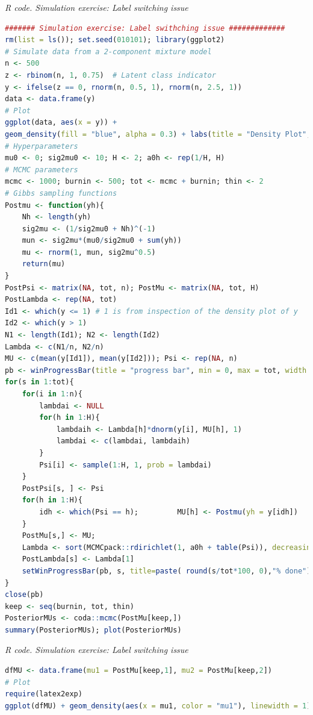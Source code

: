 \begin{tcolorbox}[enhanced,width=4.67in,center upper,
	fontupper=\large\bfseries,drop shadow southwest,sharp corners]
	\textit{R code. Simulation exercise: Label switching issue}
	\begin{VF}
		\begin{lstlisting}[language=R]
			####### Simulation exercise: Label swithching issue #############
rm(list = ls()); set.seed(010101); library(ggplot2)
# Simulate data from a 2-component mixture model
n <- 500
z <- rbinom(n, 1, 0.75)  # Latent class indicator
y <- ifelse(z == 0, rnorm(n, 0.5, 1), rnorm(n, 2.5, 1))
data <- data.frame(y)
# Plot
ggplot(data, aes(x = y)) +
geom_density(fill = "blue", alpha = 0.3) + labs(title = "Density Plot", x = "y", y = "Density") + theme_minimal()
# Hyperparameters
mu0 <- 0; sig2mu0 <- 10; H <- 2; a0h <- rep(1/H, H)
# MCMC parameters
mcmc <- 1000; burnin <- 500; tot <- mcmc + burnin; thin <- 2
# Gibbs sampling functions
Postmu <- function(yh){
	Nh <- length(yh)
	sig2mu <- (1/sig2mu0 + Nh)^(-1)
	mun <- sig2mu*(mu0/sig2mu0 + sum(yh))
	mu <- rnorm(1, mun, sig2mu^0.5)
	return(mu)
}
PostPsi <- matrix(NA, tot, n); PostMu <- matrix(NA, tot, H)
PostLambda <- rep(NA, tot)
Id1 <- which(y <= 1) # 1 is from inspection of the density plot of y 
Id2 <- which(y > 1)
N1 <- length(Id1); N2 <- length(Id2)
Lambda <- c(N1/n, N2/n)
MU <- c(mean(y[Id1]), mean(y[Id2])); Psi <- rep(NA, n)
pb <- winProgressBar(title = "progress bar", min = 0, max = tot, width = 300)
for(s in 1:tot){
	for(i in 1:n){
		lambdai <- NULL
		for(h in 1:H){
			lambdaih <- Lambda[h]*dnorm(y[i], MU[h], 1)
			lambdai <- c(lambdai, lambdaih)
		}
		Psi[i] <- sample(1:H, 1, prob = lambdai)
	}
	PostPsi[s, ] <- Psi
	for(h in 1:H){
		idh <- which(Psi == h); 		MU[h] <- Postmu(yh = y[idh])
	}
	PostMu[s,] <- MU; 
	Lambda <- sort(MCMCpack::rdirichlet(1, a0h + table(Psi)), decreasing = TRUE)
	PostLambda[s] <- Lambda[1]
	setWinProgressBar(pb, s, title=paste( round(s/tot*100, 0),"% done"))
}
close(pb)
keep <- seq(burnin, tot, thin)
PosteriorMUs <- coda::mcmc(PostMu[keep,])
summary(PosteriorMUs); plot(PosteriorMUs)
\end{lstlisting}
	\end{VF}
\end{tcolorbox}
 
\begin{tcolorbox}[enhanced,width=4.67in,center upper,
	fontupper=\large\bfseries,drop shadow southwest,sharp corners]
	\textit{R code. Simulation exercise: Label switching issue}
	\begin{VF}
		\begin{lstlisting}[language=R]
dfMU <- data.frame(mu1 = PostMu[keep,1], mu2 = PostMu[keep,2])
# Plot
require(latex2exp)
ggplot(dfMU) + geom_density(aes(x = mu1, color = "mu1"), linewidth = 1) + geom_density(aes(x = mu2, color = "mu2"), linewidth = 1) + labs(title = "Density Plot", x = TeX("$\\mu$"), y = "Density", color = "Variable") + theme_minimal() + scale_color_manual(values = c("mu1" = "blue", "mu2" = "red"))
\end{lstlisting}
	\end{VF}
\end{tcolorbox}

